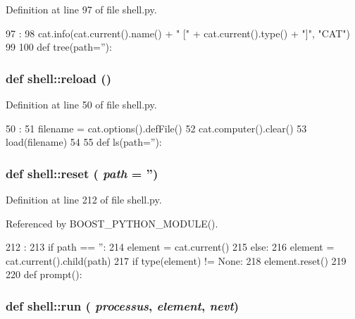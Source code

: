 Definition at line 97 of file shell.py.


\begin{DoxyCode}
97          :
98   cat.info(cat.current().name() + " [" + cat.current().type() + "]", "CAT")
99 
100 
def tree(path=''):
\end{DoxyCode}
\hypertarget{namespaceshell_a36c588aba63a5a7695f935a08536c366}{
\subsubsection[{reload}]{\setlength{\rightskip}{0pt plus 5cm}def shell::reload ()}}
\label{namespaceshell_a36c588aba63a5a7695f935a08536c366}


Definition at line 50 of file shell.py.


\begin{DoxyCode}
50             :
51   filename = cat.options().defFile()
52   cat.computer().clear()
53   load(filename)
54 
55 
def ls(path=''):
\end{DoxyCode}
\hypertarget{namespaceshell_ad0e03c54161e2f3c05d9161b44c6f06d}{
\subsubsection[{reset}]{\setlength{\rightskip}{0pt plus 5cm}def shell::reset ( {\em path} = {\ttfamily ''})}}
\label{namespaceshell_ad0e03c54161e2f3c05d9161b44c6f06d}


Definition at line 212 of file shell.py.

Referenced by BOOST\_\-PYTHON\_\-MODULE().


\begin{DoxyCode}
212                   :
213   if path == '':
214     element = cat.current()
215   else:
216     element = cat.current().child(path)
217   if type(element) != None:
218     element.reset()
219 
220 
def prompt():
\end{DoxyCode}
\hypertarget{namespaceshell_ae5a4056ea469169ac0257d9983b2e524}{
\subsubsection[{run}]{\setlength{\rightskip}{0pt plus 5cm}def shell::run ( {\em processus}, \/   {\em element}, \/   {\em nevt})}}
\label{namespaceshell_ae5a4056ea469169ac0257d9983b2e524}



